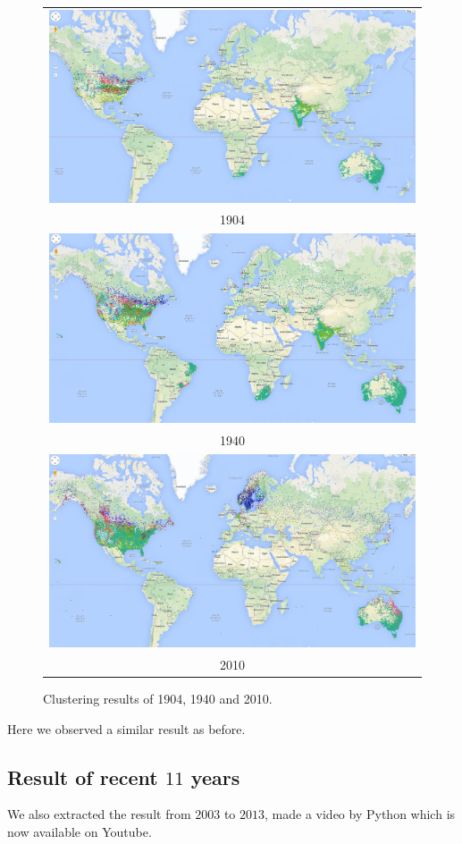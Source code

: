 \begin{figure}[htbp]
    \centering
    \begin{tabular}{c}
        \includegraphics[width =0.8\linewidth]{images/1904.png}\\ 1904\\
        \includegraphics[width =0.8\linewidth]{images/1940.png}\\ 1940\\
        \includegraphics[width =0.8\linewidth]{images/2010.png}\\ 2010\\
    \end{tabular}
    \caption{Clustering results of 1904, 1940 and 2010.}
\end{figure}

Here we observed a similar result as before. 

\subsection{Result of recent $11$ years}

We also extracted the result from $2003$ to $2013$, made a video by Python which is now available on Youtube\cite{youtube}.
